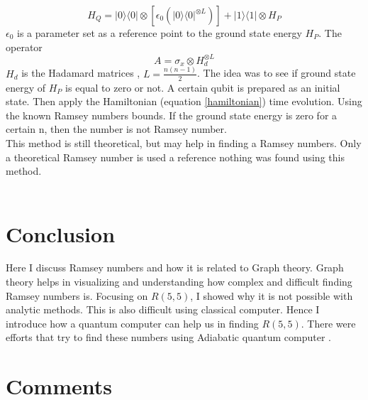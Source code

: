 \documentclass{Assignment}
\begin{document}
$$H_Q =|0\rangle\langle0|\otimes[\epsilon_0(|0\rangle\langle0|^{\otimes L})] + |1\rangle\langle 1|\otimes H_P$$
$\epsilon_0$ is a parameter set as a reference point to the ground state energy $H_P$.
The operator $$A = \sigma_x \otimes H_d^{\otimes L}$$
$H_d$ is the Hadamard matrices , $L = \frac{n(n-1)}{2}$.
The idea was to see if ground state energy of $H_P$ is equal to zero or not.
A certain qubit is prepared as an initial state.
Then apply the Hamiltonian (equation \ref{hamiltonian}) time evolution. 
Using the known Ramsey numbers bounds.
If the ground state energy is zero for a certain n, then the number is not Ramsey number. 
\\
This method is still theoretical, but may help in finding a Ramsey numbers.
Only a theoretical Ramsey number is used a reference nothing was found using this method.
\\\\
\section{Conclusion}
Here I discuss Ramsey numbers and how it is related to Graph theory.
Graph theory helps in visualizing and understanding how complex and difficult finding Ramsey numbers is.
Focusing on $R(5,5)$, I showed why it is not possible with analytic methods.
This is also difficult using classical computer.
Hence I introduce how a quantum computer can help us in finding $R(5,5)$.
There were efforts that try to find these numbers using Adiabatic quantum computer \cite{PhysRevA.93.032301}.

\newpage
\section*{Comments}
\end{document}
